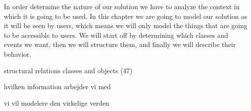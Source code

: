 In order determine the nature of our solution we have to analyze the context in which it is going to be used. In this chapter we are going to model our solution as it will be seen by users, which means we will only model the things that are going to be accessible to users. We will start off by determining which classes and events we want, then we will structure them, and finally we will describe their behavior. 

structural relations classes and objects (47)


hvilken information arbejder vi med

vi vil modelere den virkelige verden